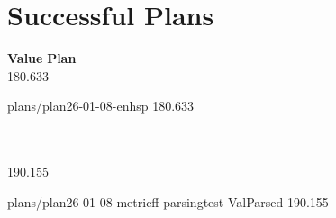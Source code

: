 \documentclass[a4paper,12pt]{article}
\begin{document}
\section{Successful Plans}
\begin{tabbing}
{\bf Value} \qquad \= {\bf Plan}\\[0.8ex]
180.633 \>\begin{minipage}[t]{12cm} plans/\-plan26-01-08-enhsp 180.633  \end{minipage}\\
 \>\\
190.155 \>\begin{minipage}[t]{12cm} plans/\-plan26-01-08-metricff-parsingtest-ValParsed 190.155  \end{minipage}\\
 \>\\
\end{tabbing}
\end{document}

